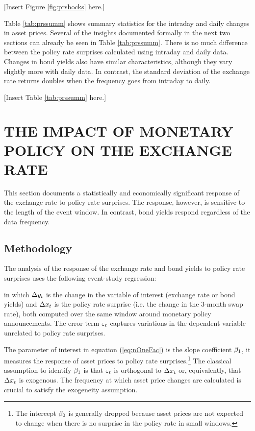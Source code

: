 \documentclass[a4paper,12pt]{article} 		%
\begin{document}
\begin{center}
	[Insert Figure \ref{fig:prshocks} here.]
\end{center}

Table \ref{tab:prssumm} shows summary statistics for the intraday and daily changes in asset prices. 
Several of the insights documented formally in the next two sections can already be seen in Table \ref{tab:prssumm}. There is no much difference between the policy rate surprises calculated using intraday and daily data. Changes in bond yields also have similar characteristics, although they vary slightly more with daily data. In contrast, the standard deviation of the exchange rate returns doubles when the frequency goes from intraday to daily.

\begin{center}
	[Insert Table \ref{tab:prssumm} here.]
\end{center}

\sectitlespace
\section{THE IMPACT OF MONETARY POLICY ON THE EXCHANGE RATE} \label{sec:policyrate}
\sectitlespace

This section documents a statistically and economically significant response of the exchange rate to policy rate surprises. The response, however, is sensitive to the length of the event window. In contrast, bond yields respond regardless of the data frequency. 

\sectitlespace
\subsection{Methodology}
\sectitlespace
The analysis of the response of the exchange rate and bond yields to policy rate surprises uses the following event-study regression:
	
\noindent in which \(\Delta y_{t}\) is the change in the variable of interest (exchange rate or bond yields) and \(\Delta x_{t}\) is the policy rate surprise (i.e. the change in the 3-month swap rate), both computed over the same window around monetary policy announcements. The error term \(\varepsilon_{t}\) captures variations in the dependent variable unrelated to policy rate surprises.

The parameter of interest in equation (\ref{eq:nOneFac}) is the slope coefficient \(\beta_{1}\), it measures the response of asset prices to policy rate surprises.\footnote{The intercept \(\beta_{0}\) is generally dropped because asset prices are not expected to change when there is no surprise in the policy rate in small windows.} The classical assumption to identify \(\beta_{1}\) is that \(\varepsilon_{t}\) is orthogonal to \(\Delta x_{t}\) or, equivalently, that \(\Delta x_{t}\) is exogenous. The frequency at which asset price changes are calculated is crucial to satisfy the exogeneity assumption. 
\end{document}
